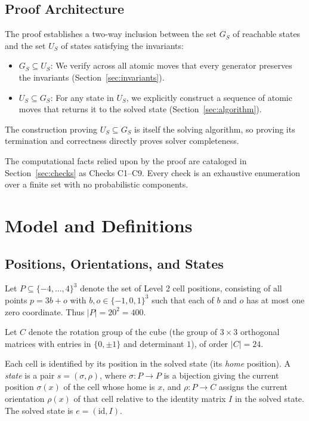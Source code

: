 \documentclass[a4paper,11pt]{article}
\begin{document}
\subsection{Proof Architecture}

The proof establishes a two-way inclusion between the set $G_S$ of reachable states and the set $U_S$ of states satisfying the invariants:
\begin{itemize}
\item $G_S\subseteq U_S$: We verify across all atomic moves that every generator preserves the invariants (Section~\ref{sec:invariants}).
\item $U_S\subseteq G_S$: For any state in $U_S$, we explicitly construct a sequence of atomic moves that returns it to the solved state (Section~\ref{sec:algorithm}).
\end{itemize}
The construction proving $U_S\subseteq G_S$ is itself the solving algorithm, so proving its termination and correctness directly proves solver completeness.

The computational facts relied upon by the proof are cataloged in Section~\ref{sec:checks} as Checks C1--C9.
Every check is an exhaustive enumeration over a finite set with no probabilistic components.

\section{Model and Definitions}\label{sec:setting}

\subsection{Positions, Orientations, and States}

Let $P\subseteq\{-4,\dots,4\}^3$ denote the set of Level 2 cell positions, consisting of all points $p=3b+o$ with $b,o\in\{-1,0,1\}^3$ such that each of $b$ and $o$ has at most one zero coordinate.
Thus $|P|=20^2=400$.

Let $C$ denote the rotation group of the cube (the group of $3\times3$ orthogonal matrices with entries in $\{0,\pm1\}$ and determinant $1$), of order $|C|=24$.

Each cell is identified by its position in the solved state (its \emph{home} position).
A \emph{state} is a pair $s=(\sigma,\rho)$, where $\sigma\colon P\to P$ is a bijection giving the current position $\sigma(x)$ of the cell whose home is $x$, and $\rho\colon P\to C$ assigns the current orientation $\rho(x)$ of that cell relative to the identity matrix $I$ in the solved state.
The solved state is $e=(\mathrm{id},I)$.
\end{document}
